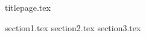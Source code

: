 \documentclass[a4paper, 12pt]{article}
\theoremstyle{definition}
\theoremstyle{plain}
\theoremstyle{remark}
\begin{document}
  {titlepage.tex}

  \tableofcontents
  \fontsize{14pt}{20pt}\selectfont
  \newpage
  \fontsize{14pt}{20pt}\selectfont

  {section1.tex}
  {section2.tex}
  {section3.tex}
    
\end{document}
